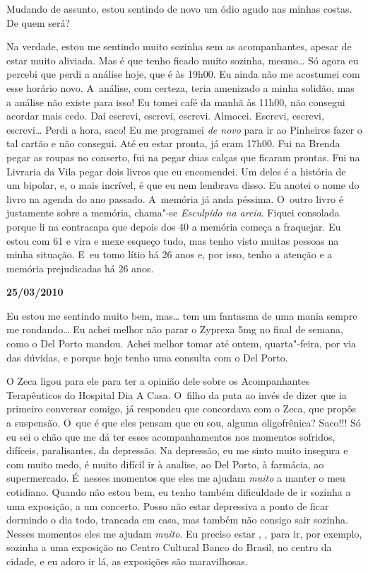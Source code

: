Mudando de assunto, estou sentindo de novo um ódio agudo nas minhas
costas. De quem será?

Na verdade, estou me sentindo muito sozinha sem as acompanhantes, apesar
de estar muito aliviada. Mas é que tenho ficado muito sozinha,
mesmo… Só agora eu percebi que perdi a análise hoje, que é às
19h00. Eu ainda não me acostumei com esse horário novo. A~análise, com
certeza, teria amenizado a minha solidão, mas a análise não existe para
isso! Eu tomei café da manhã às 11h00, não consegui acordar mais cedo.
Daí escrevi, escrevi, escrevi. Almocei. Escrevi, escrevi,
escrevi… Perdi a hora, saco! Eu me programei \emph{de novo} para
ir ao Pinheiros fazer o tal cartão e não consegui. Até eu estar pronta,
já eram 17h00. Fui na Brenda pegar as roupas no conserto, fui na 
pegar duas calças que ficaram prontas. Fui na Livraria da Vila pegar
dois livros que eu encomendei. Um deles é a história de um bipolar, e, o
mais incrível, é que eu nem lembrava disso. Eu anotei o nome do livro na
agenda do ano passado. A~memória já anda péssima. O~outro livro é
justamente sobre a memória, chama"-se \emph{Esculpido na areia}. Fiquei
consolada porque li na contracapa que depois dos 40 a memória começa a
fraquejar. Eu estou com 61 e vira e mexe esqueço tudo, mas tenho visto
muitas pessoas na minha situação. E~eu tomo lítio há 26 anos e, por
isso, tenho a atenção e a memória prejudicadas há 26 anos.

\begin{center}\textbf{\asterisc{}}\end{center}


\begin{flushright}\textbf{25/03/2010}\end{flushright}


Eu estou me sentindo muito bem, mas… tem um fantasma de uma mania
sempre me rondando… Eu achei melhor não parar o Zyprexa 5mg no
final de semana, como o Del Porto mandou. Achei melhor tomar até ontem,
quarta"-feira, por via das dúvidas, e porque hoje tenho uma consulta com
o Del Porto.

O Zeca ligou para ele para ter a opinião dele sobre os Acompanhantes
Terapêuticos do Hospital Dia A Casa. O~filho da puta ao invés de dizer
que ia primeiro conversar comigo, já respondeu que concordava com o
Zeca, que propôs a suspensão. O~que é que eles pensam que eu sou, alguma
oligofrênica? Saco!!! Só eu sei o chão que me dá ter esses
acompanhamentos nos momentos sofridos, difíceis, paralisantes, da
depressão. Na depressão, eu me sinto muito insegura e com muito medo, é
muito difícil ir à analise, ao Del Porto, à farmácia, ao supermercado. É~nesses momentos que eles me ajudam \emph{muito} a manter o meu
cotidiano. Quando não estou bem, eu tenho também dificuldade de ir
sozinha a uma exposição, a um concerto. Posso não estar depressiva a
ponto de ficar dormindo o dia todo, trancada em casa, mas também não
consigo sair sozinha. Nesses momentos eles me ajudam \emph{muito}. Eu
preciso estar , ,  para ir, por exemplo, sozinha a uma
exposição no Centro Cultural Banco do Brasil, no centro da cidade, e eu
adoro ir lá, as exposições são maravilhosas.

